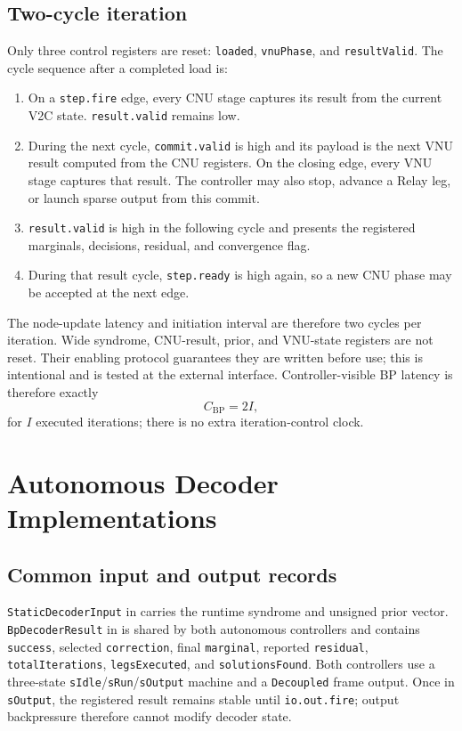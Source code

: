 \documentclass[10pt,conference]{IEEEtran}
\begin{document}
\subsection{Two-cycle iteration}
Only three control registers are reset: \texttt{loaded}, \texttt{vnuPhase}, and
\texttt{resultValid}.  The cycle sequence after a completed load is:
\begin{enumerate}
  \item On a \texttt{step.fire} edge, every CNU stage captures its result from
        the current V2C state.  \texttt{result.valid} remains low.
  \item During the next cycle, \texttt{commit.valid} is high and its payload is
        the next VNU result computed from the CNU registers.  On the closing
        edge, every VNU stage captures that result.  The controller may also
        stop, advance a Relay leg, or launch sparse output from this commit.
  \item \texttt{result.valid} is high in the following cycle and presents the
        registered marginals, decisions, residual, and convergence flag.
  \item During that result cycle, \texttt{step.ready} is high again, so a new
        CNU phase may be accepted at the next edge.
\end{enumerate}
The node-update latency and initiation interval are therefore two cycles per
iteration.  Wide syndrome, CNU-result, prior, and VNU-state registers are not
reset.  Their enabling protocol guarantees they are written before use; this
is intentional and is tested at the external interface.  Controller-visible BP
latency is therefore exactly
\begin{equation}
 C_{\mathrm{BP}}=2I,
 \label{eq:bp-clocks}
\end{equation}
for $I$ executed iterations; there is no extra iteration-control clock.

\section{Autonomous Decoder Implementations}
\subsection{Common input and output records}
\texttt{StaticDecoderInput} in  carries the
runtime syndrome and unsigned prior vector.  \texttt{BpDecoderResult} in
 is shared by both autonomous controllers and contains
\texttt{success}, selected \texttt{correction}, final \texttt{marginal},
reported \texttt{residual}, \texttt{totalIterations}, \texttt{legsExecuted},
and \texttt{solutionsFound}.  Both controllers use a three-state
\texttt{sIdle}/\texttt{sRun}/\texttt{sOutput} machine and a
\texttt{Decoupled} frame output.  Once in \texttt{sOutput}, the registered
result remains stable until \texttt{io.out.fire}; output backpressure therefore
cannot modify decoder state.
\end{document}
